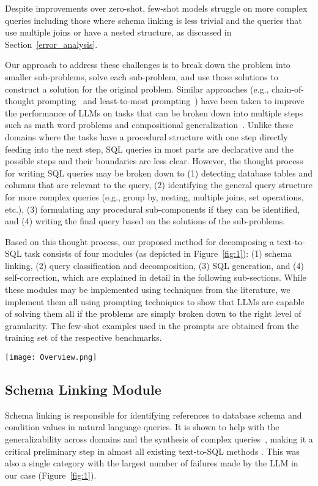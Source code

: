 \label{sec:method}
Despite improvements over zero-shot, few-shot models struggle on more complex queries including those where schema linking is less trivial and the queries that use multiple joins or have a nested structure, as discussed in Section~\ref{error_analysis}.

Our approach to address these challenges is to break down the problem into smaller sub-problems, solve each sub-problem, and use those solutions to construct a solution for the original problem. Similar approaches (e.g., chain-of-thought prompting~\citep{wei2022chain} and least-to-most prompting~\citep{zhou2022least}) have been taken to improve the performance of LLMs on tasks that can be broken down into multiple steps such as math word problems and compositional generalization~\citep{cobbe2021training,lake2018generalization}. Unlike these domains where the tasks have a procedural structure with one step directly feeding into the next step, SQL queries in most parts are declarative and the possible steps and their boundaries are less clear. However, the thought process for writing SQL queries may be broken down to (1) detecting database tables and columns that are relevant to the query, (2) identifying the general query structure for more complex queries (e.g., group by, nesting, multiple joins, set operations, etc.), (3) formulating any procedural sub-components if they can be identified, and (4) writing the final query based on the solutions of the sub-problems.

Based on this thought process, our proposed method for decomposing a text-to-SQL task consists of four modules (as depicted in Figure~\ref{fig:1}):
(1) schema linking, (2) query classification and decomposition, (3) SQL generation, and (4) self-correction, which are explained in detail in the following sub-sections. While these modules may be implemented using techniques from the literature, we implement them all using prompting techniques to show that LLMs are capable of solving them all if the problems are simply broken down to the right level of granularity. The few-shot examples used in the prompts are obtained from the training set of the respective benchmarks.

\begin{figure*}[t]
  \texttt{[image: Overview.png]}
  \caption{An overview of the proposed methodology including all four modules}
  \label{fig:1}
\end{figure*}

\subsection{Schema Linking Module}
Schema linking is responsible for identifying references to database schema and condition values in natural language queries.  It is shown to help with the generalizability across domains and the synthesis of complex queries~\citep{lei2020re}, making it a critical preliminary step in almost all existing text-to-SQL methods  \citep{cao2021lgesql, wang2019rat, guo2019towards, xuan2021sead}. This was also a single category with the largest number of failures made by the LLM in our case (Figure~\ref{fig:1}).

